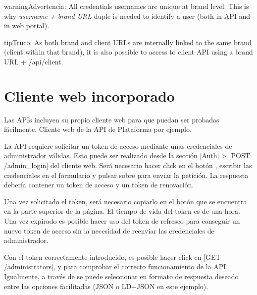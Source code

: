 \documentclass[letterpaper,10pt,spanish]{sphinxmanual}
\begin{document}
\begin{notice}{warning}{Advertencia:}
All credentials usernames are unique at brand level. This is why \emph{username + brand URL} duple is needed to
identify a user (both in API and in web portal).
\end{notice}

\begin{notice}{tip}{Truco:}
As both brand and client URLs are internally linked to the same brand (client within that brand), it is also
possible to access to client API using a brand URL + /api/client.
\end{notice}


\chapter{Cliente web incorporado}
\label{api_rest/web_client:built-in-web-client}\label{api_rest/web_client::doc}
Las APIs incluyen su propio cliente web para que puedan ser probadas fácilmente. Cliente web de la API de Plataforma por ejemplo.


La API requiere solicitar un token de acceso mediante unas credenciales de administrador válidas. Esto puede ser realizado desde la sección {[}Auth{]} \textgreater{} {[}POST /admin\_login{]} del cliente web. Será necesario hacer click en el botón , escribir las credenciales en el formulario y pulsar sobre  para enviar la petición. La respuesta debería contener un token de acceso y un token de renovación.


Una vez solicitado el token, será necesario copiarlo en el botón  que se encuentra en la parte superior de la página. El tiempo de vida del token es de una hora. Una vez expirado es posible hacer uso del token de refresco para conseguir un nuevo token de acceso sin la necesidad de reenviar las credenciales de administrador.

Con el token correctamente introducido, es posible hacer click en {[}GET /administrators{]},  y  para comprobar el correcto funcionamiento de la API. Igualmente, a través de  se puede seleccionar en formato de respuesta deseado entre las opciones facilitadas (JSON o LD+JSON en este ejemplo).
\end{document}
